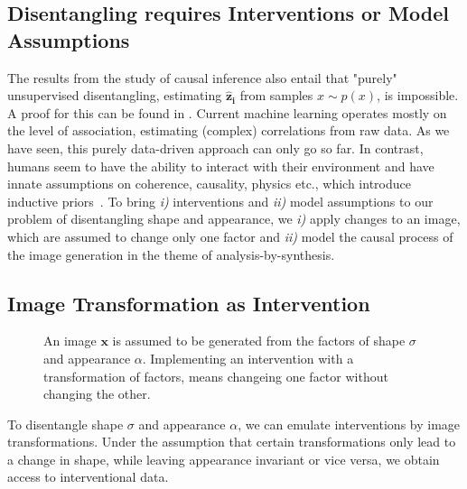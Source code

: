 	\subsection{Disentangling requires Interventions or Model Assumptions}\label{sec:requirements}
		The results from the study of causal inference also entail that "purely" unsupervised disentangling, \ie estimating $\mathbf{\hat z_i}$ from samples $x \sim p(x)$, is impossible. A proof for this can be found in \cite{locatello18challenging}.
		Current machine learning operates mostly on the level of association, estimating (complex) correlations from raw data.
		As we have seen, this purely data-driven approach can only go so far.
		In contrast, humans seem to have the ability to interact with their environment and have innate assumptions on coherence, causality, physics etc., which introduce inductive priors~\cite{tenenbaum18think}.
		To bring \emph{i)} interventions and \emph{ii)} model assumptions to our problem of disentangling shape and appearance, we \emph{i)} apply changes to an image, which are assumed to change only one factor and \emph{ii)} model the causal process of the image generation in the theme of analysis-by-synthesis.
%
%
%

	\subsection{Image Transformation as Intervention}\label{sec:transform}
		\begin{figure}[htp]
			\centering
			
			\caption{An image $\mathbf{x}$ is assumed to be generated from the factors of shape $\sigma$ and appearance $\alpha$. Implementing an intervention with a transformation of factors, means changeing one factor without changing the other.}
			\label{fig:intervene}
		\end{figure}
		To disentangle shape $\sigma$ and appearance $\alpha$, we can emulate interventions by image transformations. Under the assumption that certain transformations only lead to a change in shape, while leaving appearance invariant or vice versa, we obtain access to interventional data. %


